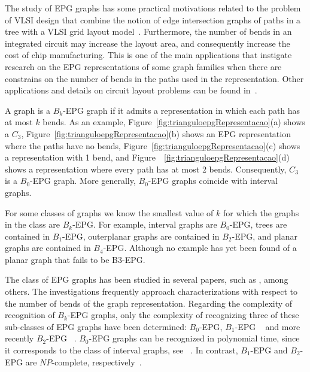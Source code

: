 \documentclass[9pt]{entcs}
\begin{document}
The study of EPG graphs has some practical motivations  related to the problem of VLSI design that combine the notion  of  edge  intersection graphs  of  paths  in  a  tree  with  a  VLSI  grid  layout  model~\cite{golumbic2009}. Furthermore, the number of bends in an integrated circuit may increase the layout area, and consequently increase the cost of chip manufacturing.
This is one of the main applications that instigate research on the EPG representations of some graph families when there are constrains on the number of bends in the paths used in the representation.
Other applications and  details  on  circuit  layout  problems can be found in~\cite{bandy1990, molitor1991}.  %

A graph is a $ B_k$-EPG graph if it admits a representation in which each path has at most $k$ bends. As an example, Figure~\ref{fig:trianguloepgRepresentacao}(a) shows a $C_3$, Figure~\ref{fig:trianguloepgRepresentacao}(b) shows an EPG representation where the paths have no bends, Figure~\ref{fig:trianguloepgRepresentacao}(c) shows a representation with 1 bend, and Figure~~\ref{fig:trianguloepgRepresentacao}(d) shows a representation where every path has at most 2 bends. Consequently, $C_3$ is a $B_0$-EPG graph. More generally, $B_0$-EPG graphs coincide with interval graphs.

For some classes of graphs we know the smallest value of $k$ for which the graphs in the class are $B_k$-EPG. For example, interval graphs are $B_0$-EPG, trees are contained in $ B_1$-EPG, outerplanar graphs are contained in $B_2$-EPG, and planar graphs are contained in $ B_4 $-EPG. Although no example has yet been found of a planar graph that fails to be B3-EPG.

The class of EPG graphs has been studied in several papers, such as \cite{alcon2016, Asinowski2009, cohen2014, golumbic2009, heldt2014,  martin2017}, among others. The investigations frequently approach characterizations with respect to the number of bends of the graph representation. Regarding the complexity of recognition of $B_k$-EPG graphs, only the complexity of recognizing three of these sub-classes of EPG graphs have been determined: $ B_0$-EPG, $ B_1$-EPG ~\cite{heldt2014} and more recently $B_2$-EPG ~\cite {martin2017}.  $ B_0$-EPG graphs can be recognized in polynomial time, since it corresponds to the class of interval graphs, see ~\cite{booth1976}. In contrast, $B_1$-EPG and $B_2$-EPG are $NP$-complete, respectively~\cite{heldt2014, martin2017}.
\end{document}
